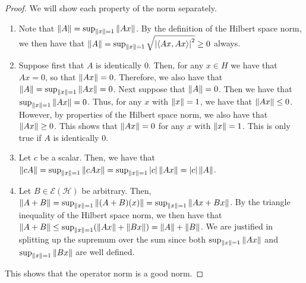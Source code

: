 \begin{proof}
    We will show each property of the norm separately.
    \begin{enumerate}
        \item   Note that $\left\| A \right\| = \sup_{\left\| x \right\| = 1} \left\| Ax \right\|$. By the definition of the Hilbert
            space norm, we then have that $\left\| A \right\| = \sup_{\left\| x \right\| = 1} \sqrt{\left\vert \langle Ax, Ax \rangle \right\vert^2}
            \geq 0$ always.
        \item   Suppose first that $A$ is identically $0$. Then, for any $x \in H$ we have that $Ax =
            0$, so that $\left\| Ax \right\| = 0$. Therefore, we also have that $\left\| A \right\| = \sup_{\left\| x \right\| = 1}
            \left\| Ax \right\| = 0$. Next suppose that $\left\| A \right\| = 0$. Then we have that $\sup_{\left\| x \right\| = 1}
            \left\| Ax \right\| = 0$. Thus, for any $x$ with $\left\| x \right\| = 1$, we have that $\left\| Ax \right\| \leq 0$.
            However, by properties of the Hilbert space norm, we also have that $\left\| Ax \right\| \geq 0$. This
            shows that $\left\| Ax \right\| = 0$ for any $x$ with $\left\| x \right\| = 1$. This is only true if $A$ is
            identically $0$.
        \item   Let $c$ be a scalar. Then, we have that $\left\| cA \right\| = \sup_{\left\| x \right\| = 1} \left\| cAx \right\| =
            \sup_{\left\| x \right\| = 1} \left\vert c \right\vert\left\| Ax \right\| = \left\vert c \right\vert \left\| A \right\|$.
        \item   Let $B \in \mathscr{E}(\mathcal{H})$ be arbitrary. Then, $\left\| A + B \right\| = \sup_{\left\| x \right\|
            = 1} \left\| (A+B)(x) \right\| = \sup_{\left\| x \right\| = 1} \left\| Ax + Bx \right\|$. By the triangle inequality of
            the Hilbert space norm, we then have that $\left\| A + B \right\| \leq \sup_{\left\| x \right\| = 1} (\left\| Ax \right\|
            + \left\| Bx \right\|) = \left\| A \right\| + \left\| B \right\|$. We are justified in splitting up the supremum over the
            sum since both $\sup_{\left\| x \right\| = 1} \left\| Ax \right\|$ and $\sup_{\left\| x \right\| = 1} \left\| Bx \right\|$ are well
            defined.
    \end{enumerate}
    This shows that the operator norm is a good norm.
\end{proof}

